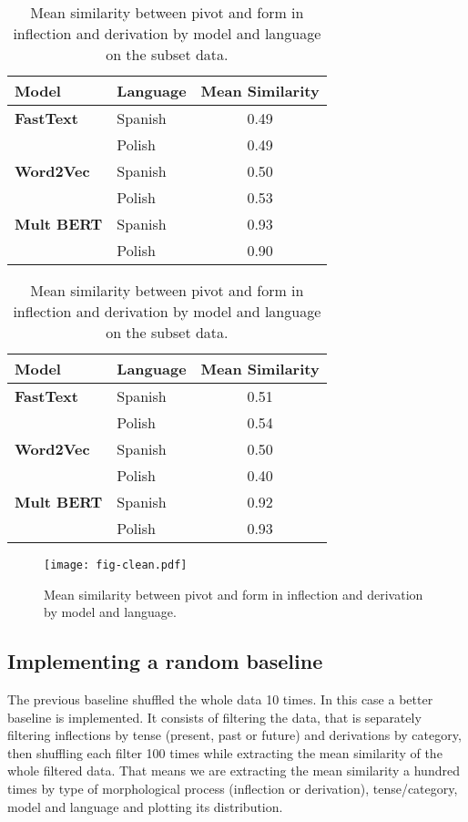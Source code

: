 \documentclass[12pt]{article}
\begin{document}
\begin{table}[ht]
\centering
\label{tbl:subset-results}
\begin{minipage}[t]{0.48\textwidth}
\small
\centering
{}
\begin{tabular}{llc}
\toprule
\textbf{Model} & \textbf{Language} & \textbf{Mean Similarity} \\
\midrule
\textbf{FastText}  & Spanish & 0.49 \\
                   & Polish  & 0.49 \\
\textbf{Word2Vec}  & Spanish & 0.50 \\
                   & Polish  & 0.53 \\
\textbf{Mult BERT} & Spanish & 0.93 \\
                   & Polish  & 0.90 \\
\bottomrule
\end{tabular}
\end{minipage}
\hfill
\begin{minipage}[t]{0.48\textwidth}
\small
\centering
{}
\begin{tabular}{llc}
\toprule
\textbf{Model} & \textbf{Language} & \textbf{Mean Similarity} \\
\midrule
\textbf{FastText}  & Spanish & 0.51 \\
                   & Polish  & 0.54 \\
\textbf{Word2Vec}  & Spanish & 0.50 \\
                   & Polish  & 0.40 \\
\textbf{Mult BERT} & Spanish & 0.92 \\
                   & Polish  & 0.93 \\
\bottomrule
\end{tabular}
\end{minipage}
\caption{Mean similarity between pivot and form in inflection and derivation by model and language on the subset data.}
\end{table}


\begin{figure}[ht]
\centering
\texttt{[image: fig-clean.pdf]}
\caption{Mean similarity between pivot and form in inflection and derivation by model and language.}
\label{fig:clean-data}
\end{figure}


\subsection{Implementing a random baseline}
The previous baseline shuffled the whole data 10 times. In this case a better baseline is implemented. It consists of filtering the data, that is separately filtering inflections by tense (present, past or future) and derivations by category, then shuffling each filter 100 times while extracting the mean similarity of the whole filtered data. That means we are extracting the mean similarity a hundred times by type of morphological process (inflection or derivation), tense/category, model and language and plotting its distribution.
\end{document}
